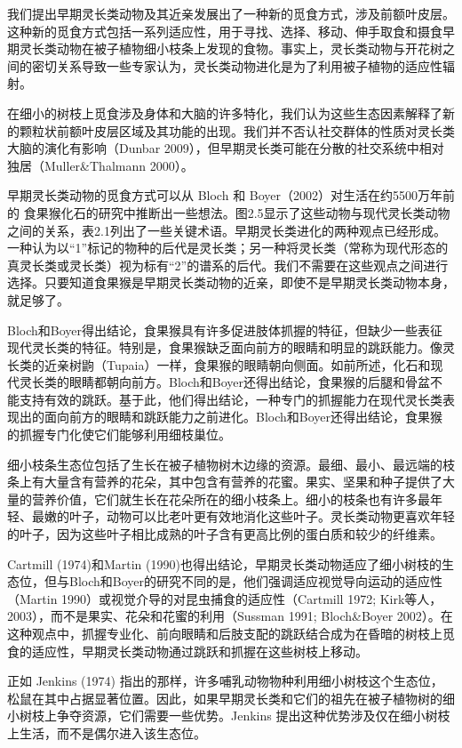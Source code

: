 我们提出早期灵长类动物及其近亲发展出了一种新的觅食方式，涉及前额叶皮层。这种新的觅食方式包括一系列适应性，用于寻找、选择、移动、伸手取食和摄食早期灵长类动物在被子植物细小枝条上发现的食物。事实上，灵长类动物与开花树之间的密切关系导致一些专家认为，灵长类动物进化是为了利用被子植物的适应性辐射。

在细小的树枝上觅食涉及身体和大脑的许多特化，我们认为这些生态因素解释了新的颗粒状前额叶皮层区域及其功能的出现。我们并不否认社交群体的性质对灵长类大脑的演化有影响（Dunbar 2009），但早期灵长类可能在分散的社交系统中相对独居（Muller\&Thalmann 2000）。

早期灵长类动物的觅食方式可以从 Bloch 和 Boyer（2002）对生活在约5500万年前的 食果猴化石的研究中推断出一些想法。图2.5显示了这些动物与现代灵长类动物之间的关系，表2.1列出了一些关键术语。早期灵长类进化的两种观点已经形成。一种认为以“1”标记的物种的后代是灵长类；另一种将灵长类（常称为现代形态的真灵长类或灵长类）视为标有“2”的谱系的后代。我们不需要在这些观点之间进行选择。只要知道食果猴是早期灵长类动物的近亲，即使不是早期灵长类动物本身，就足够了。

Bloch和Boyer得出结论，食果猴具有许多促进肢体抓握的特征，但缺少一些表征现代灵长类的特征。特别是，食果猴缺乏面向前方的眼睛和明显的跳跃能力。像灵长类的近亲树鼩（Tupaia）一样，食果猴的眼睛朝向侧面。如前所述，化石和现代灵长类的眼睛都朝向前方。Bloch和Boyer还得出结论，食果猴的后腿和骨盆不能支持有效的跳跃。基于此，他们得出结论，一种专门的抓握能力在现代灵长类表现出的面向前方的眼睛和跳跃能力之前进化。Bloch和Boyer还得出结论，食果猴的抓握专门化使它们能够利用细枝巢位。

细小枝条生态位包括了生长在被子植物树木边缘的资源。最细、最小、最远端的枝条上有大量含有营养的花朵，其中包含有营养的花蜜。果实、坚果和种子提供了大量的营养价值，它们就生长在花朵所在的细小枝条上。细小的枝条也有许多最年轻、最嫩的叶子，动物可以比老叶更有效地消化这些叶子。灵长类动物更喜欢年轻的叶子，因为这些叶子相比成熟的叶子含有更高比例的蛋白质和较少的纤维素。

Cartmill (1974)和Martin (1990)也得出结论，早期灵长类动物适应了细小树枝的生态位，但与Bloch和Boyer的研究不同的是，他们强调适应视觉导向运动的适应性（Martin 1990）或视觉介导的对昆虫捕食的适应性（Cartmill 1972; Kirk等人，2003），而不是果实、花朵和花蜜的利用（Sussman 1991; Bloch\&Boyer 2002）。在这种观点中，抓握专业化、前向眼睛和后肢支配的跳跃结合成为在昏暗的树枝上觅食的适应性，早期灵长类动物通过跳跃和抓握在这些树枝上移动。

正如 Jenkins (1974) 指出的那样，许多哺乳动物物种利用细小树枝这个生态位，松鼠在其中占据显著位置。因此，如果早期灵长类和它们的祖先在被子植物树的细小树枝上争夺资源，它们需要一些优势。Jenkins 提出这种优势涉及仅在细小树枝上生活，而不是偶尔进入该生态位。

